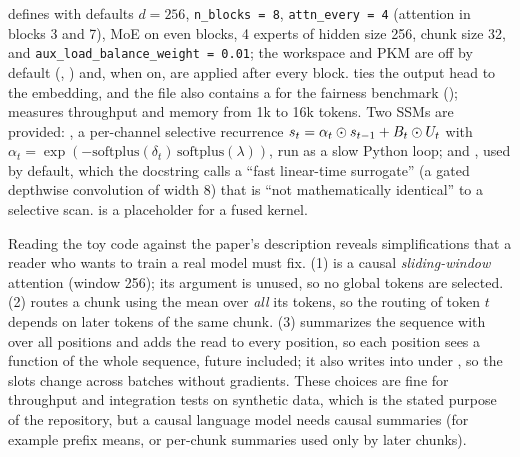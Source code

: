 \begin{implnote}[title={In the code: the toy model}]
 defines  with defaults $d =
256$, \texttt{n\_blocks = 8}, \texttt{attn\_every = 4} (attention in blocks 3 and 7), MoE on even blocks,
4 experts of hidden size 256, chunk size 32, and \texttt{aux\_load\_balance\_weight = 0.01}; the
workspace and PKM are off by default (, ) and, when on, are
applied after every block.  ties the output head to the embedding, and the file
also contains a  for the fairness benchmark
();  measures throughput and memory
from 1k to 16k tokens. Two SSMs are provided: , a per-channel selective recurrence
$s_t = \alpha_t\odot s_{t-1} + B_t\odot U_t$ with $\alpha_t = \exp(-\mathrm{softplus}(\delta_t)
\,\mathrm{softplus}(\lambda))$, run as a slow Python loop; and , used by default,
which the docstring calls a ``fast linear-time surrogate'' (a gated depthwise convolution of width
8) that is ``not mathematically identical'' to a selective scan.  is a
placeholder for a fused kernel.
\end{implnote}

\begin{pitfall}[title={Pitfall: the prototypes are not causal language models}]
Reading the toy code against the paper's description reveals simplifications that a reader who
wants to train a real model must fix. (1)  is a causal
\emph{sliding-window} attention (window 256); its  argument is unused, so no
global tokens are selected. (2)  routes a chunk using the mean over \emph{all}
its tokens, so the routing of token $t$ depends on later tokens of the same chunk. (3)
 summarizes the sequence with  over all positions and adds
the read to every position, so each position sees a function of the whole sequence, future
included; it also writes into  under , so the slots change
across batches without gradients. These choices are fine for throughput and integration tests on
synthetic data, which is the stated purpose of the repository, but a causal language model needs
causal summaries (for example prefix means, or per-chunk summaries used only by later chunks).
\end{pitfall}

